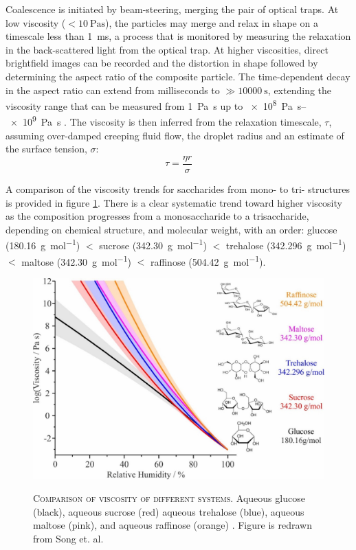 Coalescence is initiated by beam-steering, merging the pair of optical traps. At low viscosity ($<\SI{10}{\pascal\second}$), the particles may merge and relax in shape on a timescale less than \SI{1}{\milli\second}, a process that is monitored by measuring the relaxation in the back-scattered light from the optical trap. At higher viscosities, direct brightfield images can be recorded and the distortion in shape followed by determining the aspect ratio of the composite particle. The time-dependent decay in the aspect ratio can extend from milliseconds to $\gg \SI{10000}{\second}$, extending the viscosity range that can be measured from \SI{1}{\pascal\second}  up to \SIrange[range-phrase=\text{--}]{e8}{e9}{\pascal\second} \cite{Song2016a}. The viscosity is then inferred from the relaxation timescale, $\tau$, assuming over-damped creeping fluid flow, the droplet radius and an estimate of the surface tension, $\sigma$:
\begin{equation}
\tau=\frac{\eta r}{\sigma}
\end{equation}

A comparison of the viscosity trends for saccharides from mono- to tri- structures is provided in figure \ref{fig:wat_s6}. There is a clear systematic trend toward higher viscosity as the composition progresses from a monosaccharide to a trisaccharide, depending on chemical structure, and molecular weight, with an order: glucose (\SI{180.16}{\gram\per\mole}) $<$ sucrose (\SI{342.30}{\gram\per\mol}) $<$ trehalose (\SI{342.296}{\gram\per\mol}) $<$ maltose (\SI{342.30}{\gram\per\mol}) $<$ raffinose (\SI{504.42}{\gram\per\mol}).


\begin{figure}
    \centering
    \caption[Comparison of viscosity of different systems]{\textsc{Comparison of viscosity of different systems}. Aqueous glucose (black), aqueous sucrose (red) aqueous trehalose (blue), aqueous maltose (pink), and aqueous raffinose (orange) \cite{Song2016a}. Figure is redrawn from Song et. al. \cite{Song2016a}}
    \includegraphics{chapters/water_hopping/figures/image014.jpg}
    \label{fig:wat_s6}
\end{figure}

